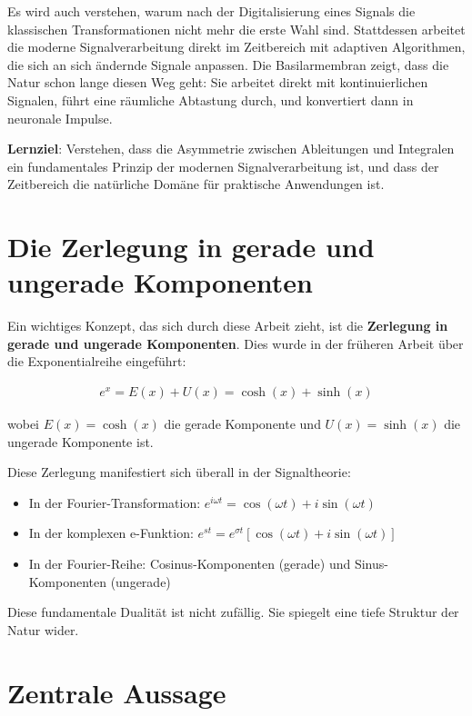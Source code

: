 ﻿\documentclass[a4paper,12pt]{report}
\theoremstyle{definition}
\begin{document}
	Es wird auch verstehen, warum nach der Digitalisierung eines Signals die klassischen Transformationen nicht mehr die erste Wahl sind. Stattdessen arbeitet die moderne Signalverarbeitung direkt im Zeitbereich mit adaptiven Algorithmen, die sich an sich ändernde Signale anpassen. Die Basilarmembran zeigt, dass die Natur schon lange diesen Weg geht: Sie arbeitet direkt mit kontinuierlichen Signalen, führt eine räumliche Abtastung durch, und konvertiert dann in neuronale Impulse.
	
	\textbf{Lernziel}: Verstehen, dass die Asymmetrie zwischen Ableitungen und Integralen ein fundamentales Prinzip der modernen Signalverarbeitung ist, und dass der Zeitbereich die natürliche Domäne für praktische Anwendungen ist.
	
	
	\section{Die Zerlegung in gerade und ungerade Komponenten}
	
	Ein wichtiges Konzept, das sich durch diese Arbeit zieht, ist die \textbf{Zerlegung in gerade und ungerade Komponenten}. Dies wurde in der früheren Arbeit über die Exponentialreihe eingeführt:
	
	\begin{align}
		e^x = E(x) + U(x) = \cosh(x) + \sinh(x)
	\end{align}
	
	wobei $E(x) = \cosh(x)$ die gerade Komponente und $U(x) = \sinh(x)$ die ungerade Komponente ist.
	
	Diese Zerlegung manifestiert sich überall in der Signaltheorie:
	\begin{itemize}
		\item[-] In der Fourier-Transformation: $e^{i\omega t} = \cos(\omega t) + i\sin(\omega t)$
		\item[-] In der komplexen e-Funktion: $e^{st} = e^{\sigma t}[\cos(\omega t) + i\sin(\omega t)]$
		\item[-] In der Fourier-Reihe: Cosinus-Komponenten (gerade) und Sinus-Komponenten (ungerade)
	\end{itemize}
	
	Diese fundamentale Dualität ist nicht zufällig. Sie spiegelt eine tiefe Struktur der Natur wider.
	
	\section{Zentrale Aussage}
	
\end{document}
